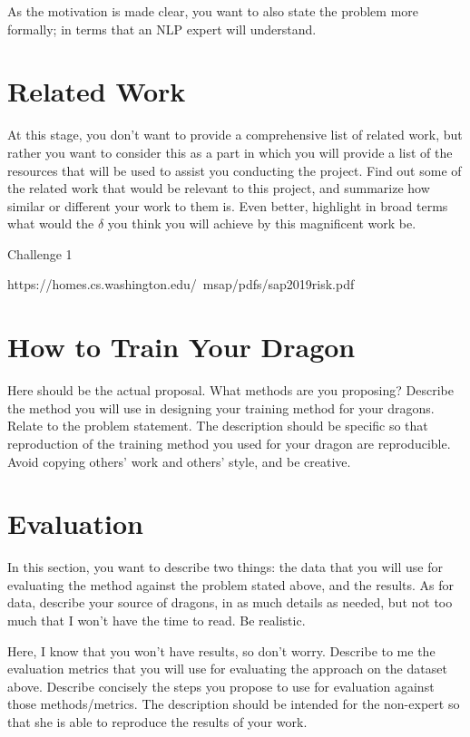 \documentclass[conference]{sig-alternate-05-2015}
\begin{document}
As the motivation is made clear, you want to also state the problem more formally; in terms that an NLP expert will understand.
\color{black}

\section{Related Work}\label{sec:related}
\color{red}At this stage, you don't want to provide a comprehensive list of related work, but rather you want to consider this as a part in which you will provide a list of the resources that will be used to assist you conducting the project. Find out some of the related work that would be relevant to this project, and summarize how similar or different your work to them is. Even better, highlight in broad terms what would the $\delta$ you think you will achieve by this magnificent work be.
\color{green}


Challenge 1

https://homes.cs.washington.edu/~msap/pdfs/sap2019risk.pdf
\color{black}



\section{How to Train Your Dragon}\label{sec:design}
\color{red}Here should be the actual proposal. What methods are you proposing? Describe the method you will use in designing your training method for your dragons. Relate to the problem statement. The description should be specific so that reproduction of the training method you used for your dragon are reproducible. Avoid copying others' work and others' style, and be creative.
\color{black}

\section{Evaluation}\label{sec:evaluation}

\color{red}In this section, you want to describe two things: the data that you will use for evaluating the method against the problem stated above, and the results. As for data, describe your source of dragons, in as much details as needed, but not too much that I won't have the time to read. Be realistic.

Here, I know that you won't have results, so don't worry. Describe to me the evaluation metrics that you will use for evaluating the approach on the dataset above. Describe concisely the steps you propose to use for evaluation against those methods/metrics. The description should be intended for the non-expert so that she is able to reproduce the results of your work. 
\end{document}
